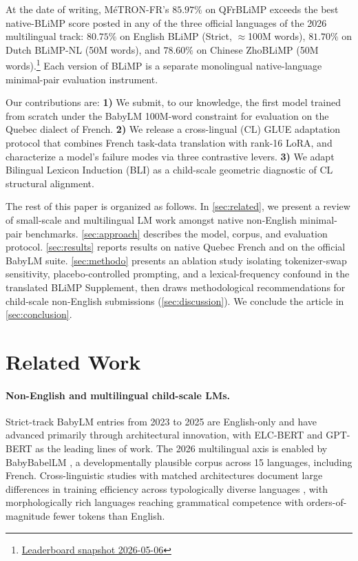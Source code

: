 \documentclass[11pt]{article}
\begin{document}
At the date of writing, MéTRON-FR's $85.97\%$ on QFrBLiMP exceeds the best native-BLiMP score posted in any of the three official languages of the 2026 multilingual track: $80.75\%$ on English BLiMP (Strict, $\approx$100M words), $81.70\%$ on Dutch BLiMP-NL (50M words), and $78.60\%$ on Chinese ZhoBLiMP (50M words).\footnote{\href{https://huggingface.co/spaces/BabyLM-community/BabyLM-Leaderboard-2026}{Leaderboard snapshot 2026-05-06}} Each version of BLiMP is a separate monolingual native-language minimal-pair evaluation instrument.

Our contributions are: \textbf{1)} We submit, to our knowledge, the first model trained from scratch under the BabyLM 100M-word constraint for evaluation on the Quebec dialect of French. \textbf{2)} We release a cross-lingual (CL) GLUE adaptation protocol that combines French task-data translation with rank-16 LoRA, and characterize a model's failure modes via three contrastive levers. \textbf{3)} We adapt Bilingual Lexicon Induction (BLI) as a child-scale geometric diagnostic of CL structural alignment.

The rest of this paper is organized as follows. In \autoref{sec:related}, we present a review of small-scale and multilingual LM work amongst native non-English minimal-pair benchmarks. \autoref{sec:approach} describes the model, corpus, and evaluation protocol. \autoref{sec:results} reports results on native Quebec French and on the official BabyLM suite. \autoref{sec:methodo} presents an ablation study isolating tokenizer-swap sensitivity, placebo-controlled prompting, and a lexical-frequency confound in the translated BLiMP Supplement, then draws methodological recommendations for child-scale non-English submissions (\autoref{sec:discussion}). We conclude the article in \autoref{sec:conclusion}.

\section{Related Work}
\label{sec:related}

\paragraph{Non-English and multilingual child-scale LMs.} Strict-track BabyLM entries from 2023 to 2025 \citep{warstadt2023babylm,hu2024babylm,charpentier2025babylm} are English-only and have advanced primarily through architectural innovation, with ELC-BERT \citep{charpentier2023elcbert} and GPT-BERT \citep{charpentier2024gptbert} as the leading lines of work. 
The 2026 multilingual axis \citep{babylm2026cfp} is enabled by BabyBabelLM \citep{jumelet2026babelm}, a developmentally plausible corpus across 15 languages, including French. 
Cross-linguistic studies with matched architectures document large differences in training efficiency across typologically diverse languages \citep{wasserman2026scaling}, with morphologically rich languages reaching grammatical competence with orders-of-magnitude fewer tokens than English.
\end{document}
